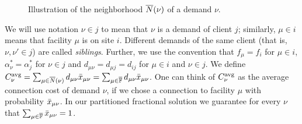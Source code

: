 \documentclass[oneside,final]{ucr}
\def\dsp{\def\baselinestretch{2.0}\large\normalsize}
\begin{document}
\begin{figure}[ht]
  \centering
  \caption{Illustration of the neighborhood ${\overline{N}}(\nu)$ of a demand $\nu$.}
  \label{fig:neighborhood}
\end{figure}
\dsp
We will use notation $\nu\in j$ to
mean that $\nu$ is a demand of client $j$; similarly,
$\mu\in i$ means that facility $\mu$ is on site
$i$. Different demands of the same client (that is,
$\nu,\nu'\in j$) are called \emph{siblings}.  Further, we
use the convention that $f_\mu = f_i$ for $\mu\in i$,
$\alpha_\nu^\ast = \alpha_j^\ast$ for $\nu\in j$ and
$d_{\mu\nu} = d_{\mu j} = d_{ij}$ for $\mu\in i$ and $\nu\in
j$.  We define $C^{{\mbox{\scriptsize\rm avg}}}_{\nu}
=\sum_{\mu\in{\overline{N}}(\nu)}d_{\mu\nu}{\bar x}_{\mu\nu} =
\sum_{\mu\in\overline{\mathbb{F}}}d_{\mu\nu}{\bar x}_{\mu\nu}$.  One can
think of $C^{{\mbox{\scriptsize\rm avg}}}_{\nu}$ as the average connection cost of
demand $\nu$, if we chose a connection to facility $\mu$
with probability ${\bar x}_{\mu\nu}$. In our partitioned
fractional solution we guarantee for every $\nu$ that
$\sum_{\mu\in\overline{\mathbb{F}}} {\bar x}_{\mu\nu}=1$.
\end{document}
